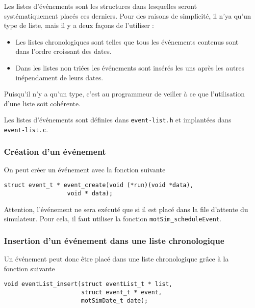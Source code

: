    Les listes d'événements sont les structures dans lesquelles seront
systématiquement placés ces derniers. Pour des raisons de simplicité,
il n'ya qu'un type de liste, mais il y a deux façons de l'utiliser :

\begin{itemize}
   \item Les listes chronologiques sont telles que tous les événements
     contenus sont dans l'ordre croissant des dates.
   \item Dans les listes non triées les événements sont insérés les
     uns après les autres inépendament de leurs dates.
\end{itemize}

   Puisqu'il n'y a qu'un type, c'est au programmeur de veiller à ce
que l'utilisation d'une liste soit cohérente.

   Les listes d'événements sont définies dans {\tt event-list.h} et
implantées dans {\tt event-list.c}.  

%
\subsubsection{Création d'un événement}
 
   On peut créer un événement avec la fonction suivante 

\begin{verbatim}
struct event_t * event_create(void (*run)(void *data),
			      void * data);
\end{verbatim}

   Attention, l'événement ne sera exécuté que si il est placé dans la
file d'attente du simulateur. Pour cela, il faut utiliser la fonction
{\tt motSim\_scheduleEvent}. 

%
\subsubsection{Insertion d'un événement dans une liste chronologique}

   Un événement peut donc être placé dans une liste chronologique
grâce à la fonction suivante

\begin{verbatim}
void eventList_insert(struct eventList_t * list,
                      struct event_t * event,
                      motSimDate_t date);
\end{verbatim}

